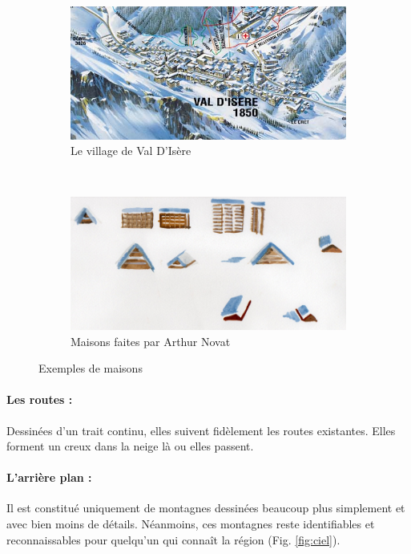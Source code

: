 \begin{figure}[h!]
\centering
 \begin{subfigure}[t]{0.47\textwidth}
 \centering
 \includegraphics[width=1.0\linewidth]{novat/PN_maison.png}
 \caption{\label{fig:village} Le village de Val D’Isère}
 \end{subfigure}%
 ~
 \hspace{.05\textwidth}
 \begin{subfigure}[t]{0.47\textwidth}
 \centering
 \includegraphics[width=1.0\linewidth]{novat/novat_maison.png}
 \caption{\label{fig:maisonsseul} Maisons faites par Arthur Novat}
 \end{subfigure}
 \caption{\label{fig:ExMaison} Exemples de maisons}
\end{figure}

\paragraph*{Les routes :} Dessinées d'un trait continu, elles suivent fidèlement les routes existantes. Elles forment un creux dans la neige là ou elles passent. 

\paragraph*{L’arrière plan :}
Il est constitué uniquement de montagnes dessinées beaucoup plus simplement et avec bien moins de détails. Néanmoins, ces montagnes reste identifiables et reconnaissables pour quelqu'un qui connaît la région (Fig. \ref{fig:ciel}). 

